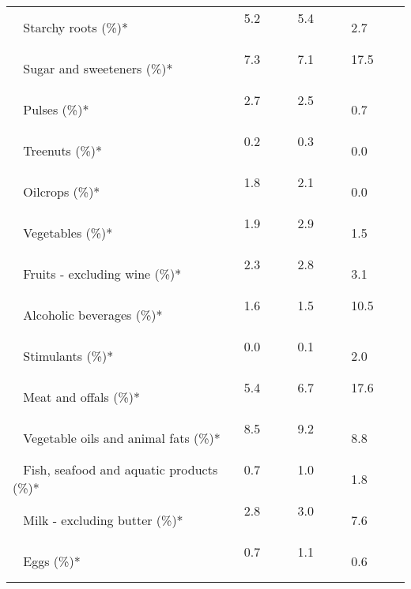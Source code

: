 \begin{tabular}{L{3.9cm} R{1cm} R{1cm} R{1cm}}
	 ~ Starchy roots (\%)* & 5.2 ~ \ \ & 5.4 ~ \ \ & 2.7 ~ \ \ \\ 
	 ~ Sugar and sweeteners (\%)* & 7.3 ~ \ \ & 7.1 ~ \ \ & 17.5 ~ \ \ \\ 
	 ~ Pulses (\%)* & 2.7 ~ \ \ & 2.5 ~ \ \ & 0.7 ~ \ \ \\ 
	 ~ Treenuts (\%)* & 0.2 ~ \ \ & 0.3 ~ \ \ & 0.0 ~ \ \ \\ 
	 ~ Oilcrops (\%)* & 1.8 ~ \ \ & 2.1 ~ \ \ & 0.0 ~ \ \ \\ 
	 ~ Vegetables (\%)* & 1.9 ~ \ \ & 2.9 ~ \ \ & 1.5 ~ \ \ \\ 
	 ~ Fruits - excluding wine (\%)* & 2.3 ~ \ \ & 2.8 ~ \ \ & 3.1 ~ \ \ \\ 
	 ~ Alcoholic beverages (\%)* & 1.6 ~ \ \ & 1.5 ~ \ \ & 10.5 ~ \ \ \\ 
	 ~ Stimulants (\%)* & 0.0 ~ \ \ & 0.1 ~ \ \ & 2.0 ~ \ \ \\ 
	 ~ Meat and offals (\%)* & 5.4 ~ \ \ & 6.7 ~ \ \ & 17.6 ~ \ \ \\ 
	 ~ Vegetable oils and animal fats (\%)* & 8.5 ~ \ \ & 9.2 ~ \ \ & 8.8 ~ \ \ \\ 
	 ~ Fish, seafood and aquatic products (\%)* & 0.7 ~ \ \ & 1.0 ~ \ \ & 1.8 ~ \ \ \\ 
	 ~ Milk - excluding butter (\%)* & 2.8 ~ \ \ & 3.0 ~ \ \ & 7.6 ~ \ \ \\ 
	 ~ Eggs (\%)* & 0.7 ~ \ \ & 1.1 ~ \ \ & 0.6 ~ \ \ \\ 
       \toprule
      \end{tabular}
      \clearpage
{}
